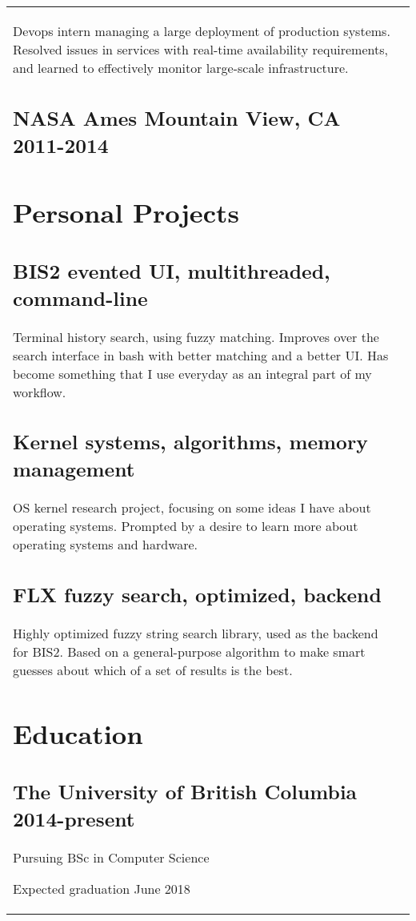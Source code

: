 \documentclass[letterpaper]{article}
\newlength{\leftcol}
\newlength{\rightcol}
\newcommand{\subtitle}{\normalfont\sffamily\color{black}\large}
\begin{document}
\begin{tabularx}{\textwidth}{@{}p{\leftcol} p{\rightcol}}
Devops intern managing a large deployment of production systems. Resolved issues
in services with real-time availability requirements, and learned to effectively
monitor large-scale infrastructure.

\subsection*{NASA Ames \subtitle Mountain View, CA 2011-2014}

\section*{Personal Projects}

\subsection*{BIS2 \subtitle evented UI, multithreaded, command-line}

Terminal history search, using fuzzy matching. Improves over the search interface
in bash with better matching and a better UI. Has become something that I use
everyday as an integral part of my workflow.

\subsection*{Kernel \subtitle systems, algorithms, memory management}

OS kernel research project, focusing on some ideas I have about operating
systems. Prompted by a desire to learn more about operating systems and
hardware.

\subsection*{FLX \subtitle fuzzy search, optimized, backend}

Highly optimized fuzzy string search library, used as the backend for BIS2.
Based on a general-purpose algorithm to make smart guesses about which of a set
of results is the best.

\section*{Education}

\subsection*{The University of British Columbia \subtitle 2014-present}

Pursuing BSc in Computer Science

Expected graduation June 2018
\end{tabularx}
\end{document}
